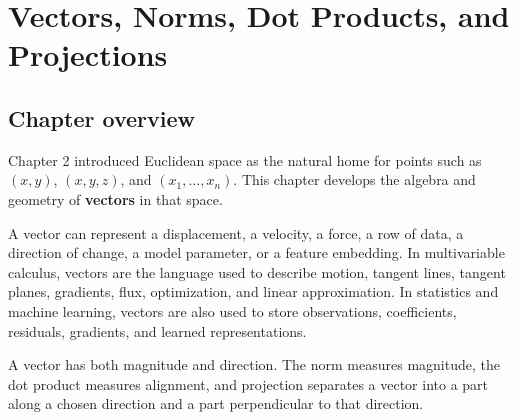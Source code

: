 
\newcommand{\R}{\mathbb{R}}
\newcommand{\norm}[1]{\left\lVert #1\right\rVert}
\newcommand{\abs}[1]{\left\lvert #1\right\rvert}
\newcommand{\vect}[1]{\left\langle #1\right\rangle}
\newcommand{\proj}{\operatorname{proj}}
\newcommand{\comp}{\operatorname{comp}}
\newcommand{\dist}{\operatorname{dist}}


\setcounter{chapter}{2}

\chapter{Vectors, Norms, Dot Products, and Projections}
\label{ch:vectors-norms-dot-products-projections}

\section*{Chapter overview}

Chapter 2 introduced Euclidean space as the natural home for points such as $(x,y)$, $(x,y,z)$, and $(x_1,\ldots,x_n)$. This chapter develops the algebra and geometry of \textbf{vectors} in that space.

A vector can represent a displacement, a velocity, a force, a row of data, a direction of change, a model parameter, or a feature embedding. In multivariable calculus, vectors are the language used to describe motion, tangent lines, tangent planes, gradients, flux, optimization, and linear approximation. In statistics and machine learning, vectors are also used to store observations, coefficients, residuals, gradients, and learned representations.

\begin{mainideabox}
A vector has both magnitude and direction. The norm measures magnitude, the dot product measures alignment, and projection separates a vector into a part along a chosen direction and a part perpendicular to that direction.
\end{mainideabox}

